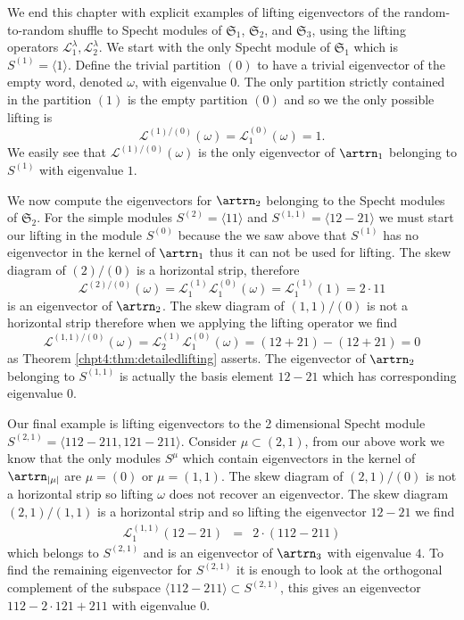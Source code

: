 \documentclass[11pt]{report}
\begin{document}
We end this chapter with explicit examples of lifting eigenvectors of the random-to-random shuffle to Specht modules of $\mathfrak{S}_{1}$,  $\mathfrak{S}_{2}$, and $\mathfrak{S}_{3}$, using the lifting operators $\mathcal{L}^{\lambda}_{1},\mathcal{L}^{\lambda}_{2}$. We start with the only Specht module of $\mathfrak{S}_{1}$ which is $S^{(1)} = \langle 1 \rangle$.
Define the trivial partition $(0)$ to have a trivial eigenvector of the empty word, denoted $\omega$, with eigenvalue $0$. The only partition strictly contained in the partition $(1)$ is the empty partition $(0)$ and so we the only possible lifting is 
\[\mathcal{L}^{(1)/(0)}(\omega) = \mathcal{L}^{(0)}_{1}(\omega) =1.\] 
We easily see that  $\mathcal{L}^{(1)/(0)}(\omega)$ is the only eigenvector of $\artrn_{1}$ belonging to $S^{(1)}$ with eigenvalue $1$.

We now compute the eigenvectors for $\artrn_{2}$ belonging to the Specht modules of $\mathfrak{S}_{2}$. For the simple modules $S^{(2)} = \langle 11 \rangle$ and $S^{(1,1)} = \langle 12-21 \rangle$ we must start our lifting in the module $S^{(0)}$ because the we saw above that $S^{(1)}$ has no eigenvector in the kernel of $\artrn_{1}$ thus it can not be used for lifting. The skew diagram of $(2)/(0)$ is a horizontal strip, therefore 
\[\mathcal{L}^{(2)/(0)} (\omega) = \mathcal{L}_{1}^{(1)} \mathcal{L}_{1}^{(0)} (\omega) = \mathcal{L}_{1}^{(1)} (1) = 2\cdot 11\] 
is an eigenvector of $\artrn_{2}$. The skew diagram of $(1,1)/(0)$ is not a horizontal strip therefore when we applying the lifting operator we find 
\[\mathcal{L}^{(1,1)/(0)} (\omega) = \mathcal{L}_{2}^{(1)} \mathcal{L}_{1}^{(0)}(\omega) =  (12 +21 ) - (12 +21) = 0\]
as Theorem \ref{chpt4:thm:detailedlifting} asserts. The eigenvector of $\artrn_{2}$ belonging to $S^{(1,1)}$ is actually the basis element $12 -21$ which has corresponding eigenvalue $0$.

Our final example is lifting eigenvectors to the 2 dimensional Specht module $S^{(2,1)} = \langle 112 -211, 121 -211 \rangle$. Consider $\mu \subset (2,1)$, from our above work we know that the only modules $S^{\mu}$ which contain eigenvectors in the kernel of $\artrn_{|\mu|}$ are $\mu = (0)$ or $\mu= (1,1)$. The skew diagram of $(2,1)/(0)$ is not a horizontal strip so lifting $\omega$ does not recover an eigenvector. The skew diagram $(2,1)/(1,1)$ is a horizontal strip and so lifting the eigenvector $12-21$ we find
\begin{eqnarray}
\mathcal{L}_{1}^{(1,1)}(12-21) & = &2\cdot (112 - 211)  \nonumber
\end{eqnarray}
which belongs to $S^{(2,1)}$ and is an eigenvector of $\artrn_{3}$ with eigenvalue $4$. To find the remaining eigenvector for $S^{(2,1)}$ it is enough to look at the orthogonal complement of the subspace $\langle 112-211 \rangle \subset S^{(2,1)}$, this gives an eigenvector $112 - 2\cdot 121 +211$ with eigenvalue $0$. 
\end{document}
